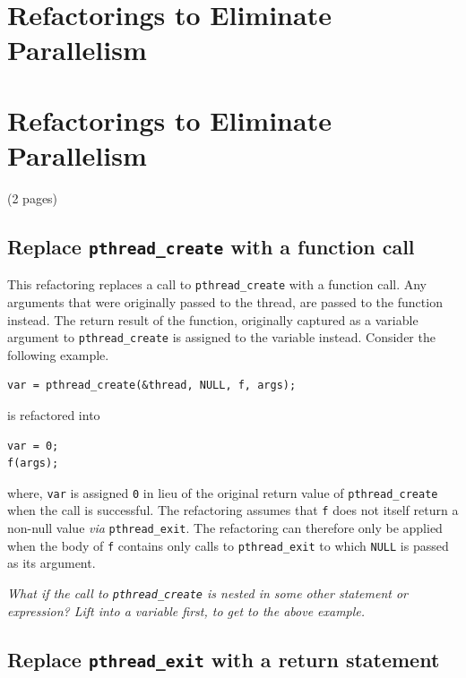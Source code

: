 \section{Refactorings to Eliminate Parallelism}
\section{Refactorings to Eliminate Parallelism} (2 pages)

\subsection{Replace \lstinline|pthread_create| with a function call}

This refactoring replaces a call to \lstinline|pthread_create| with a function call. Any arguments that were originally passed to the thread, are passed to the function instead. The return result of the function, originally captured as a variable argument to \lstinline|pthread_create| is assigned to the variable instead. Consider the following example.

\begin{lstlisting}[frame=single]
var = pthread_create(&thread, NULL, f, args);
\end{lstlisting}

\noindent
is refactored into

\begin{lstlisting}[frame=single]
var = 0;
f(args);
\end{lstlisting}

\noindent
where, \texttt{var} is assigned \texttt{0} in lieu of the original return value of \lstinline|pthread_create| when the call is successful. The refactoring assumes that \lstinline|f| 
does not itself return a non-null value \emph{via} \lstinline|pthread_exit|. The refactoring can therefore only be applied when the body of \lstinline|f| contains only calls to \lstinline|pthread_exit| to which \lstinline|NULL| is passed as its argument. %

\emph{What if the call to \lstinline|pthread_create| is nested in some other statement or expression? Lift into a variable first, to get to the above example.}

\subsection{Replace \lstinline|pthread_exit| with a return statement}

